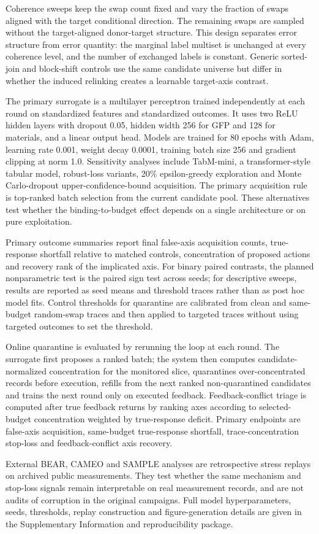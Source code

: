 Coherence sweeps keep the swap count fixed and vary the fraction of swaps aligned with the target conditional direction. The remaining swaps are sampled without the target-aligned donor-target structure. This design separates error structure from error quantity: the marginal label multiset is unchanged at every coherence level, and the number of exchanged labels is constant. Generic sorted-join and block-shift controls use the same candidate universe but differ in whether the induced relinking creates a learnable target-axis contrast.

The primary surrogate is a multilayer perceptron trained independently at each round on standardized features and standardized outcomes. It uses two ReLU hidden layers with dropout 0.05, hidden width 256 for GFP and 128 for materials, and a linear output head. Models are trained for 80 epochs with Adam, learning rate 0.001, weight decay 0.0001, training batch size 256 and gradient clipping at norm 1.0. Sensitivity analyses include TabM-mini, a transformer-style tabular model, robust-loss variants, 20\% epsilon-greedy exploration and Monte Carlo-dropout upper-confidence-bound acquisition. The primary acquisition rule is top-ranked batch selection from the current candidate pool. These alternatives test whether the binding-to-budget effect depends on a single architecture or on pure exploitation.

Primary outcome summaries report final false-axis acquisition counts, true-response shortfall relative to matched controls, concentration of proposed actions and recovery rank of the implicated axis. For binary paired contrasts, the planned nonparametric test is the paired sign test across seeds; for descriptive sweeps, results are reported as seed means and threshold traces rather than as post hoc model fits. Control thresholds for quarantine are calibrated from clean and same-budget random-swap traces and then applied to targeted traces without using targeted outcomes to set the threshold.

Online quarantine is evaluated by rerunning the loop at each round. The surrogate first proposes a ranked batch; the system then computes candidate-normalized concentration for the monitored slice, quarantines over-concentrated records before execution, refills from the next ranked non-quarantined candidates and trains the next round only on executed feedback. Feedback-conflict triage is computed after true feedback returns by ranking axes according to selected-budget concentration weighted by true-response deficit. Primary endpoints are false-axis acquisition, same-budget true-response shortfall, trace-concentration stop-loss and feedback-conflict axis recovery.

External BEAR, CAMEO and SAMPLE analyses are retrospective stress replays on archived public measurements. They test whether the same mechanism and stop-loss signals remain interpretable on real measurement records, and are not audits of corruption in the original campaigns. Full model hyperparameters, seeds, thresholds, replay construction and figure-generation details are given in the Supplementary Information and reproducibility package.
